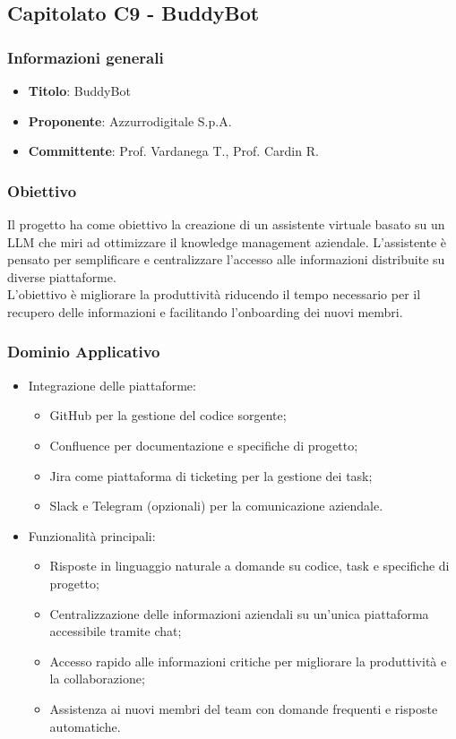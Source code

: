 \subsection{Capitolato C9 - BuddyBot}
     \subsubsection{Informazioni generali}
        \begin{itemize}
            \item \textbf{Titolo}: BuddyBot
            \item \textbf{Proponente}: Azzurrodigitale S.p.A.
            \item \textbf{Committente}: Prof. Vardanega T., Prof. Cardin R.
        \end{itemize}
    \subsubsection{Obiettivo}
    Il progetto ha come obiettivo la creazione di un assistente virtuale basato su un LLM che miri ad ottimizzare il knowledge management aziendale. L’assistente è pensato per semplificare e centralizzare l’accesso alle informazioni distribuite su diverse  piattaforme.\\
    L’obiettivo è migliorare la produttività riducendo il tempo necessario per il recupero delle informazioni e facilitando l’onboarding dei nuovi membri.
     \subsubsection{Dominio Applicativo}
    \begin{itemize}
        \item Integrazione delle piattaforme:
        \begin{itemize}
            \item GitHub per la gestione del codice sorgente;
            \item Confluence per documentazione e specifiche di progetto;
            \item Jira come piattaforma di ticketing per la gestione dei task;
            \item Slack e Telegram (opzionali) per la comunicazione aziendale.
        \end{itemize}
        \item Funzionalità principali:
        \begin{itemize}
            \item Risposte in linguaggio naturale a domande su codice, task e specifiche di progetto;
            \item Centralizzazione delle informazioni aziendali su un’unica piattaforma accessibile tramite chat;
            \item Accesso rapido alle informazioni critiche per migliorare la produttività e la collaborazione;
            \item Assistenza ai nuovi membri del team con domande frequenti e risposte automatiche.
        \end{itemize}
    \end{itemize}
